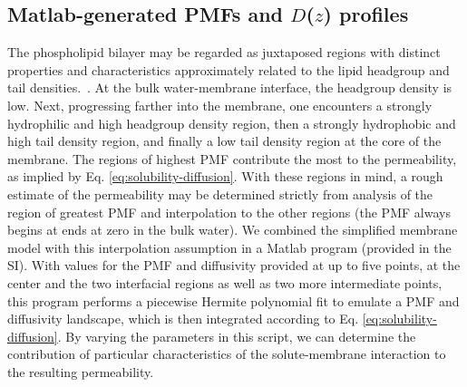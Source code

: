   \subsection{Matlab-generated PMFs and $D$($z$) profiles}
    \par The phospholipid bilayer may be regarded as juxtaposed regions with distinct properties and characteristics approximately related to the lipid headgroup and tail densities.~\cite{Marrink1994}. At the bulk water-membrane interface, the headgroup density is low. Next, progressing farther into the membrane, one encounters a strongly hydrophilic and high headgroup density region, then a strongly hydrophobic and high tail density region, and finally a low tail density region at the core of the membrane. The regions of highest PMF contribute the most to the permeability, as implied by Eq. \ref{eq:solubility-diffusion}. With these regions in mind, a rough estimate of the permeability may be determined strictly from analysis of the region of greatest PMF and interpolation to the other regions (the PMF always begins at ends at zero in the bulk water). We combined the simplified membrane model with this interpolation assumption in a Matlab program (provided in the SI). With values for the PMF and diffusivity provided at up to five points, at the center and the two interfacial regions as well as two more intermediate points, this program performs a piecewise Hermite polynomial fit to emulate a PMF and diffusivity landscape, which is then integrated according to Eq. \ref{eq:solubility-diffusion}. By varying the parameters in this script, we can determine the contribution of particular characteristics of the solute-membrane interaction to the resulting permeability.

